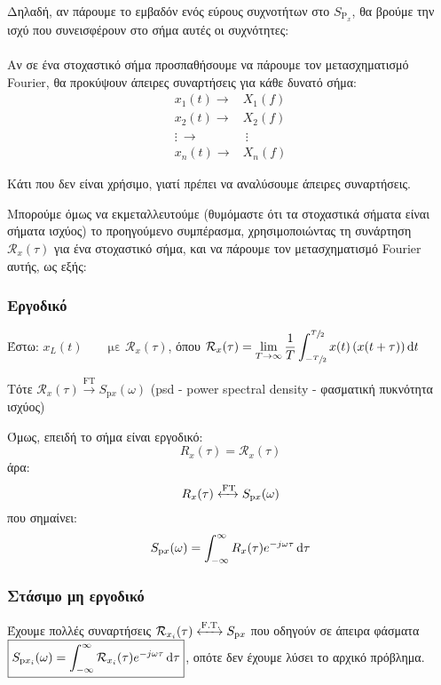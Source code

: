 \documentclass[11pt,a4paper,notitlepage,fleqn,draft]{article}
\begin{document}
Δηλαδή, αν πάρουμε το εμβαδόν ενός εύρους συχνοτήτων στο
\(  S_{\mathrm P_{x}} \), θα βρούμε την ισχύ που συνεισφέρουν στο
σήμα αυτές οι συχνότητες:

\paragraph{}
Αν σε ένα στοχαστικό σήμα προσπαθήσουμε να πάρουμε τον μετασχηματισμό
Fourier, θα προκύψουν άπειρες συναρτήσεις για κάθε δυνατό σήμα:
\begin{align*}
	x_1(t) \xrightarrow{\quad} & X_1(f) \\
	x_2(t) \xrightarrow{\quad} & X_2(f) \\
	\vdots\ \xrightarrow{\quad} & \ \vdots \\
	x_n(t) \xrightarrow{\quad} & X_n(f)
\end{align*}

Κάτι που δεν είναι χρήσιμο, γιατί πρέπει να αναλύσουμε άπειρες
συναρτήσεις.

Μπορούμε όμως να εκμεταλλευτούμε (θυμόμαστε ότι τα στοχαστικά σήματα
είναι σήματα ισχύος) το προηγούμενο συμπέρασμα, χρησιμοποιώντας τη συνάρτηση \( \mathcal{R}_x(\tau) \) για ένα στοχαστικό σήμα,
και να πάρουμε τον μετασχηματισμό Fourier αυτής, ως εξής:

\subsubsection{Εργοδικό}
Έστω: \( x_L(t) \qquad \text{με } \mathcal{R}_x(\tau) \), όπου
\( \displaystyle \mathcal{R}_x(\tau) 
= \lim_{T\to \infty} \frac{1}{T}
\int_{-\sfrac{T}{2} }^{\sfrac{T}{2} }x(t)\left(x(t+\tau)\right)\mathop{}\!\mathrm{d} t
\)

Τότε \( \mathcal{R}_x(\tau)
\xrightarrow{\text{FT}} S_{\mathrm px}(\omega ) \)
(psd - power spectral density - φασματική πυκνότητα ισχύος)

Όμως, επειδή το σήμα είναι εργοδικό:
\[
R_x(\tau) = \mathcal R_x(\tau)
\]
άρα:
\[
R_x(\tau) \xleftrightarrow{\mathrm{FT}} S_{\mathrm{p}x}(\omega )
\]
που σημαίνει:
\[
S_{\mathrm p x}(\omega ) = \int_{-\infty}^{\infty}
R_x(\tau)e^{-j\omega \tau}\mathop{}\!\mathrm{d}\tau
\]

\subsubsection{Στάσιμο μη εργοδικό}
Έχουμε πολλές συναρτήσεις \( \mathcal{R}_{x_i}(\tau)
\xleftrightarrow{\text{F.T.}} S_{\mathrm p x}
 \) που οδηγούν σε άπειρα φάσματα \\
\( \displaystyle \boxed{S_{\mathrm p x_i}(\omega ) =
	 \int_{-\infty}^{\infty}
\mathcal{R}_{x_i}(\tau) e^{-j\omega \tau}\mathop{}\!\mathrm{d} \tau} \), οπότε δεν
έχουμε λύσει το αρχικό πρόβλημα.
\end{document}
